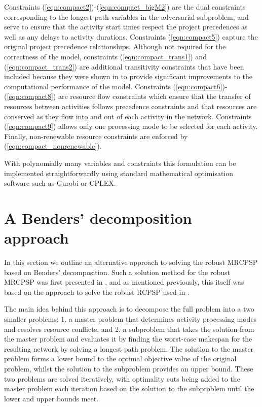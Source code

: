 \documentclass[a4paper,abstracton]{scrartcl}
\begin{document}
Constraints (\ref{eqn:compact2})-(\ref{eqn:compact_bigM2}) are the dual constraints corresponding to the longest-path variables in the adversarial subproblem, and serve to ensure that the activity start times respect the project precedences as well as any delays to activity durations. Constraints (\ref{eqn:compact5}) capture the original project precedence relationships. Although not required for the correctness of the model, constraints (\ref{eqn:compact_trans1}) and (\ref{eqn:compact_trans2}) are additional transitivity constraints that have been included because they were shown in \cite{bold2021compact} to provide significant improvements to the computational performance of the model. Constraints (\ref{eqn:compact6})-(\ref{eqn:compact8}) are resource flow constraints which ensure that the transfer of resources between activities follows precedence constraints and that resources are conserved as they flow into and out of each activity in the network. Constraints (\ref{eqn:compact9}) allows only one processing mode to be selected for each activity. Finally, non-renewable resource constraints are enforced by (\ref{eqn:compact_nonrenewable}).

With polynomially many variables and constraints this formulation can be implemented straightforwardly using standard mathematical optimisation software such as Gurobi or CPLEX.

\section{A Benders' decomposition approach}

In this section we outline an alternative approach to solving the robust MRCPSP based on Benders' decomposition. Such a solution method for the robust MRCPSP was first presented in \cite{balouka2021robust}, and as mentioned previously, this itself was based on the approach to solve the robust RCPSP used in \cite{bruni2017adjustable}.

The main idea behind this approach is to decompose the full problem into a two smaller problems: 1. a master problem that determines activity processing modes and resolves resource conflicts, and 2. a subproblem that takes the solution from the master problem and evaluates it by finding the worst-case makespan for the resulting network by solving a longest path problem. The solution to the master problem forms a lower bound to the optimal objective value of the original problem, whilst the solution to the subproblem provides an upper bound. These two problems are solved iteratively, with optimality cuts being added to the master problem each iteration based on the solution to the subproblem until the lower and upper bounds meet.
\end{document}
